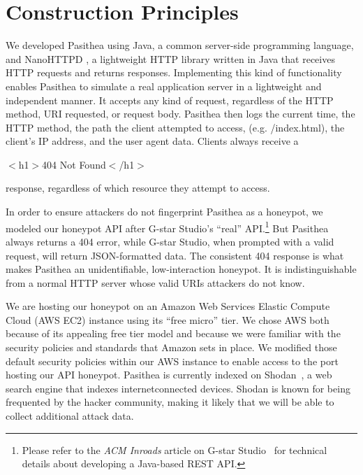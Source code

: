 
\section{Construction Principles} \label{construction}

We developed Pasithea using Java, a common server-side programming language, and NanoHTTPD \cite{Nanohttpd}, a lightweight HTTP library written in Java that receives HTTP requests and returns responses.
Implementing this kind of functionality enables Pasithea to simulate a real application server in a lightweight and independent manner. 
It accepts any kind of request, regardless of the HTTP method, URI requested, or request body. 
Pasithea then logs the current time, the HTTP method, the path the client attempted to access, (e.g. /index.html), the client's IP address, and the user agent data. 
Clients always receive a
 

\begin{center}  %
$<$h1$>$404 Not Found$<$/h1$>$ 
\end{center}

\noindent
response, regardless of which resource they attempt to access.

In order to ensure attackers do not fingerprint Pasithea as a honeypot, we modeled our honeypot API after G-star Studio's ``real'' API.\footnote{
Please refer to the {\em ACM Inroads} article on G-star Studio~\cite{inroads-Labouseur16} for technical details about developing a Java-based REST API.
} 
But Pasithea always returns a 404 error, while G-star Studio, when prompted with a valid request, will return JSON-formatted data. 
The consistent 404 response is what makes Pasithea an unidentifiable, low-interaction honeypot. 
It is indistinguishable from a normal HTTP server whose valid URIs attackers do not know. 

We are hosting our honeypot on an Amazon Web Services Elastic Compute Cloud (AWS EC2) instance using its ``free micro'' tier. 
We chose AWS both because of its appealing free tier model and because we were familiar with the security policies and standards that Amazon sets in place. 
We modified those default security policies within our AWS instance to enable access to the port hosting our API honeypot. 
Pasithea is currently indexed on Shodan~\cite{unsavoryChar}, a web search engine that indexes internetconnected devices.
Shodan is known for being frequented by the hacker community, making it likely that we will be able to collect additional attack data.
